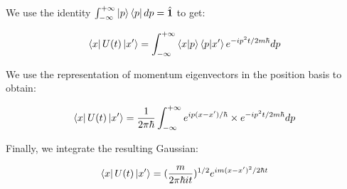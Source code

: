 
We use the identity $\int_{-\infty}^{+\infty} \ket{p}\bra{p} dp = \hat{\textbf{1}}$ to get:

\begin{equation}
   \bra{x} U(t) \ket{x'} = \int_{-\infty}^{+\infty} \braket{x}{p}\braket{p}{x'} e^{-ip^2t/2m\hbar} dp
\end{equation}

We use the representation of momentum eigenvectors in the position basis to obtain:

\begin{equation}
    \bra{x} U(t) \ket{x'} = \frac{1}{2 \pi \hbar} \int_{-\infty}^{+\infty} e^{ip(x-x')/\hbar} \times e^{-ip^2t/2m\hbar} dp
\end{equation}

Finally, we integrate the resulting Gaussian:

\begin{equation}
    \bra{x} U(t) \ket{x'} = (\frac{m}{2 \pi \hbar i t})^{1/2} e^{im(x-x')^2/2 \hbar t}
\end{equation}
